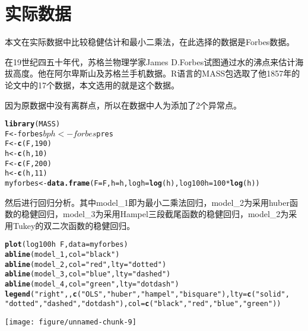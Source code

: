 \documentclass[english]{article}\usepackage[]{graphicx}\usepackage[]{color}
\makeatletter
\def\maxwidth{ %
  \ifdim\Gin@nat@width>\linewidth
    \linewidth
  \else
    \Gin@nat@width
  \fi
}
\newcommand{\hlstr}[1]{\textcolor[rgb]{0.192,0.494,0.8}{#1}}%
\newcommand{\hlkwd}[1]{\textcolor[rgb]{0.737,0.353,0.396}{\textbf{#1}}}%
\newenvironment{kframe}{%
 \def\at@end@of@kframe{}%
 \ifinner\ifhmode%
  \def\at@end@of@kframe{\end{minipage}}%
  \begin{minipage}{\columnwidth}%
 \fi\fi%
 \def\FrameCommand##1{\hskip\@totalleftmargin \hskip-\fboxsep
 \colorbox{shadecolor}{##1}\hskip-\fboxsep
     \hskip-\linewidth \hskip-\@totalleftmargin \hskip\columnwidth}%
 \MakeFramed {\advance\hsize-\width
   \@totalleftmargin\z@ \linewidth\hsize
   \@setminipage}}%
 {\par\unskip\endMakeFramed%
 \at@end@of@kframe}
\newenvironment{knitrout}{}{} %
\makeatother
\begin{document}
\section{实际数据}

本文在实际数据中比较稳健估计和最小二乘法，在此选择的数据是Forbes数据。

在19世纪四五十年代，苏格兰物理学家James D.Forbes试图通过水的沸点来估计海拔高度。他在阿尔卑斯山及苏格兰手机数据。R语言的MASS包选取了他1857年的论文中的17个数据，本文选用的就是这个数据。

因为原数据中没有离群点，所以在数据中人为添加了2个异常点。

\begin{knitrout}
\color{fgcolor}\begin{kframe}
\begin{alltt}
\hlkwd{library}(MASS)
F <- forbes$bp
h <- forbes$pres
F <- \hlkwd{c}(F, 190)
h <- \hlkwd{c}(h, 10)
F <- \hlkwd{c}(F, 200)
h <- \hlkwd{c}(h, 11)
myforbes <- \hlkwd{data.frame}(F = F, h = h, logh = \hlkwd{log}(h), log100h = 100 * \hlkwd{log}(h))
\end{alltt}
\end{kframe}
\end{knitrout}


然后进行回归分析。其中model\_1即为最小二乘法回归，model\_2为采用huber函数的稳健回归，model\_3为采用Hampel三段截尾函数的稳健回归，model\_2为采用Tukey的双二次函数的稳健回归。

\begin{knitrout}
\color{fgcolor}\begin{kframe}
\begin{alltt}
\hlkwd{plot}(log100h ~ F, data = myforbes)
\hlkwd{abline}(model_1, col = \hlstr{"black"})
\hlkwd{abline}(model_2, col = \hlstr{"red"}, lty = \hlstr{"dotted"})
\hlkwd{abline}(model_3, col = \hlstr{"blue"}, lty = \hlstr{"dashed"})
\hlkwd{abline}(model_4, col = \hlstr{"green"}, lty = \hlstr{"dotdash"})
\hlkwd{legend}(\hlstr{"right"}, , \hlkwd{c}(\hlstr{"OLS"}, \hlstr{"huber"}, \hlstr{"hampel"}, \hlstr{"bisquare"}), lty = \hlkwd{c}(\hlstr{"solid"}, 
    \hlstr{"dotted"}, \hlstr{"dashed"}, \hlstr{"dotdash"}), col = \hlkwd{c}(\hlstr{"black"}, \hlstr{"red"}, \hlstr{"blue"}, \hlstr{"green"}))
\end{alltt}
\end{kframe}
\texttt{[image: figure/unnamed-chunk-9]} 

\end{knitrout}
\end{document}
